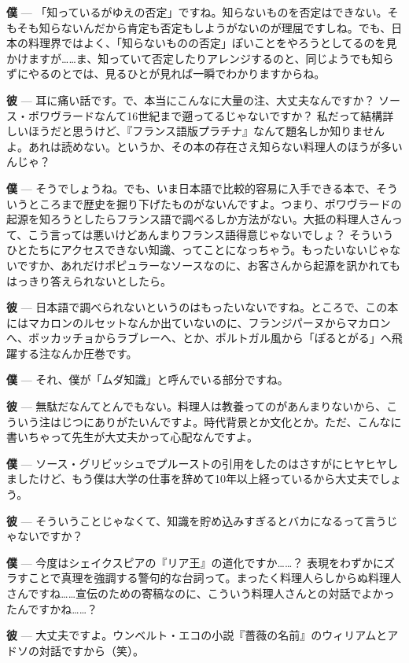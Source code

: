 \documentclass[14Q,]{ltjsbook}
\renewcommand{\ldots}{\noindent…}
\begin{document}
\textbf{僕} ---
「知っているがゆえの否定」ですね。知らないものを否定はできない。そもそも知らないんだから肯定も否定もしようがないのが理屈ですしね。でも、日本の料理界ではよく、「知らないものの否定」ぽいことをやろうとしてるのを見かけますが\ldots{}\ldots{}ま、知っていて否定したりアレンジするのと、同じようでも知らずにやるのとでは、見るひとが見れば一瞬でわかりますからね。

\textbf{彼} ---
耳に痛い話です。で、本当にこんなに大量の注、大丈夫なんですか？
ソース・ポワヴラードなんて16世紀まで遡ってるじゃないですか？
私だって結構詳しいほうだと思うけど、『フランス語版プラチナ』なんて題名しか知りませんよ。あれは読めない。というか、その本の存在さえ知らない料理人のほうが多いんじゃ？

\textbf{僕} ---
そうでしょうね。でも、いま日本語で比較的容易に入手できる本で、そういうところまで歴史を掘り下げたものがないんですよ。つまり、ポワヴラードの起源を知ろうとしたらフランス語で調べるしか方法がない。大抵の料理人さんって、こう言っては悪いけどあんまりフランス語得意じゃないでしょ？
そういうひとたちにアクセスできない知識、ってことになっちゃう。もったいないじゃないですか、あれだけポピュラーなソースなのに、お客さんから起源を訊かれてもはっきり答えられないとしたら。

\textbf{彼} ---
日本語で調べられないというのはもったいないですね。ところで、この本にはマカロンのルセットなんか出ていないのに、フランジパーヌからマカロンへ、ボッカッチョからラブレーへ、とか、ポルトガル風から「ぽるとがる」へ飛躍する注なんか圧巻です。

\textbf{僕} --- それ、僕が「ムダ知識」と呼んでいる部分ですね。

\textbf{彼} ---
無駄だなんてとんでもない。料理人は教養ってのがあんまりないから、こういう注はじつにありがたいんですよ。時代背景とか文化とか。ただ、こんなに書いちゃって先生が大丈夫かって心配なんですよ。

\textbf{僕} ---
ソース・グリビッシュでプルーストの引用をしたのはさすがにヒヤヒヤしましたけど、もう僕は大学の仕事を辞めて10年以上経っているから大丈夫でしょう。

\textbf{彼} ---
そういうことじゃなくて、知識を貯め込みすぎるとバカになるって言うじゃないですか？

\textbf{僕} ---
今度はシェイクスピアの『リア王』の道化ですか\ldots{}\ldots{}？
表現をわずかにズラすことで真理を強調する警句的な台詞って。まったく料理人らしからぬ料理人さんですね\ldots{}\ldots{}宣伝のための寄稿なのに、こういう料理人さんとの対話でよかったんですかね\ldots{}\ldots{}？

\textbf{彼} ---
大丈夫ですよ。ウンベルト・エコの小説『薔薇の名前』のウィリアムとアドソの対話ですから（笑）。
\end{document}
